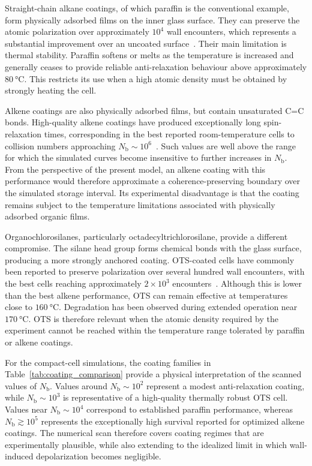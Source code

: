 Straight-chain alkane coatings, of which paraffin is the conventional example, form physically adsorbed films on the inner glass surface. They can preserve the atomic polarization over approximately $10^{4}$ wall encounters, which represents a substantial improvement over an uncoated surface~\cite{Aiacoavc_ChiEtAl_2020}. Their main limitation is thermal stability. Paraffin softens or melts as the temperature is increased and generally ceases to provide reliable anti-relaxation behaviour above approximately $\SI{80}{\degreeCelsius}$. This restricts its use when a high atomic density must be obtained by strongly heating the cell.

Alkene coatings are also physically adsorbed films, but contain unsaturated C=C bonds. High-quality alkene coatings have produced exceptionally long spin-relaxation times, corresponding in the best reported room-temperature cells to collision numbers approaching $N_{\mathrm{b}}\sim10^{6}$~\cite{Aiacoavc_ChiEtAl_2020}. Such values are well above the range for which the simulated curves become insensitive to further increases in $N_{\mathrm{b}}$. From the perspective of the present model, an alkene coating with this performance would therefore approximate a coherence-preserving boundary over the simulated storage interval. Its experimental disadvantage is that the coating remains subject to the temperature limitations associated with physically adsorbed organic films.

Organochlorosilanes, particularly octadecyltrichlorosilane, provide a different compromise. The silane head group forms chemical bonds with the glass surface, producing a more strongly anchored coating. OTS-coated cells have commonly been reported to preserve polarization over several hundred wall encounters, with the best cells reaching approximately $2\times10^{3}$ encounters~\cite{Aiacoavc_ChiEtAl_2020}. Although this is lower than the best alkene performance, OTS can remain effective at temperatures close to $\SI{160}{\degreeCelsius}$. Degradation has been observed during extended operation near $\SI{170}{\degreeCelsius}$. OTS is therefore relevant when the atomic density required by the experiment cannot be reached within the temperature range tolerated by paraffin or alkene coatings.

For the compact-cell simulations, the coating families in Table~\ref{tab:coating_comparison} provide a physical interpretation of the scanned values of $N_{\mathrm{b}}$. Values around $N_{\mathrm{b}}\sim10^{2}$ represent a modest anti-relaxation coating, while $N_{\mathrm{b}}\sim10^{3}$ is representative of a high-quality thermally robust OTS cell. Values near $N_{\mathrm{b}}\sim10^{4}$ correspond to established paraffin performance, whereas $N_{\mathrm{b}}\gtrsim10^{5}$ represents the exceptionally high survival reported for optimized alkene coatings. The numerical scan therefore covers coating regimes that are experimentally plausible, while also extending to the idealized limit in which wall-induced depolarization becomes negligible.


